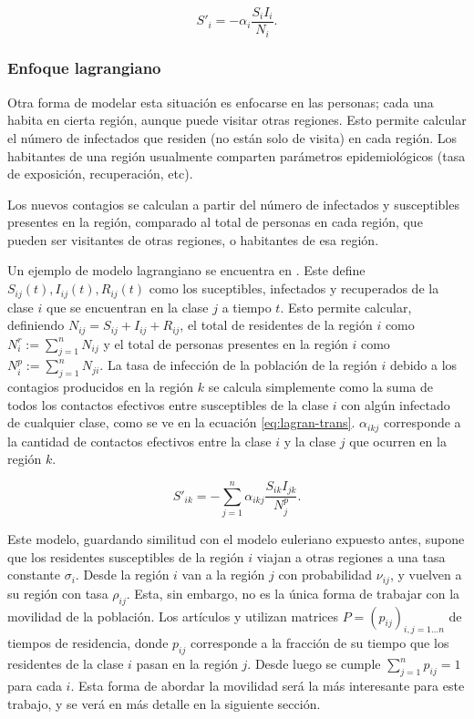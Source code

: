 \begin{equation}\label{eq:migration-transmis}
S'_i = - \alpha_i\frac{S_iI_i}{N_i}.
\end{equation}

\subsubsection*{Enfoque lagrangiano}

Otra forma de modelar esta situación es enfocarse en las personas; cada una habita en cierta región, aunque puede visitar otras regiones. Esto permite calcular el número de infectados que residen (no están solo de visita) en cada región. Los habitantes de una región usualmente comparten parámetros epidemiológicos (tasa de exposición, recuperación, etc). 

Los nuevos contagios se calculan a partir del número de infectados y susceptibles presentes en la región, comparado al total de personas en cada región, que pueden ser visitantes de otras regiones, o habitantes de esa región.

Un ejemplo de modelo lagrangiano se encuentra en \cite{Ruan2006}. Este define \(S_{ij}(t), I_{ij}(t), R_{ij}(t)\) como los suceptibles, infectados y recuperados de la clase \(i\) que se encuentran en la clase \(j\) a tiempo \(t\).  Esto permite calcular, definiendo \(N_{ij} = S_{ij} + I_{ij} + R_{ij}\), el total de residentes de la región \(i\) como \(N^r_i := \sum_{j = 1}^n N_{ij}\) y el total de personas presentes en la región \(i\) como \(N^p_i := \sum_{j = 1}^n N_{ji}\). La tasa de infección de la población de la región \(i\) debido a los contagios producidos en la región \(k\) se calcula simplemente como la suma de todos los contactos efectivos entre susceptibles de la clase \(i\) con algún infectado de cualquier clase, como se ve en la ecuación \ref{eq:lagran-trans}. \(\alpha_{ikj}\) corresponde a la cantidad de contactos efectivos entre la clase \(i\) y la clase \(j\) que ocurren en la región \(k\).

\begin{equation}\label{eq:lagran-trans}
S'_{ik} = -\sum_{j = 1}^n \alpha_{ikj} \frac{S_{ik}I_{jk}}{N^p_j}.
\end{equation}

Este modelo, guardando similitud con el modelo euleriano expuesto antes, supone que los residentes susceptibles de la región \(i\) viajan a otras regiones a una tasa constante \(\sigma_i\). Desde la región \(i\) van a la región \(j\) con probabilidad \(\nu_{ij}\), y vuelven a su región con tasa \(\rho_{ij}\). Esta, sin embargo, no es la única forma de trabajar con la movilidad de la población. Los artículos \cite{Cosner2009} y \cite{Bichara2015} utilizan matrices \(P = (p_{ij})_{i, j = 1 \dots n}\) de tiempos de residencia, donde \(p_{ij}\) corresponde a la fracción de su tiempo que los residentes de la clase \(i\) pasan en la región \(j\). Desde luego se cumple \(\sum_{j = 1}^n p_{ij} = 1\) para cada \(i\). Esta forma de abordar la movilidad será la más interesante para este trabajo, y se verá en más detalle en la siguiente sección.




